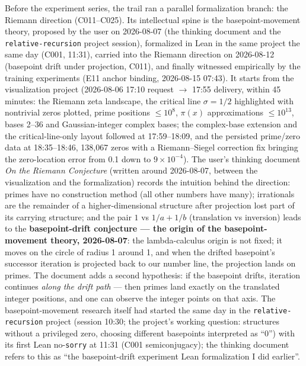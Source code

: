\documentclass[sigplan,10pt,anonymous,review]{acmart}
\begin{document}
Before the experiment series, the trail ran a parallel formalization branch:
the Riemann direction (C011--C025). Its intellectual spine is the
basepoint-movement theory, proposed by the user on 2026-08-07 (the thinking
document and the \texttt{relative-recursion} project session), formalized
in Lean in the same project the same day (C001, 11:31), carried into the
Riemann direction on 2026-08-12 (basepoint drift under projection,
C011), and finally witnessed empirically by the training experiments
(E11 anchor binding, 2026-08-15 07:43). It starts from the visualization project
(2026-08-06 17:10 request $\to$ 17:55 delivery, within 45 minutes: the
Riemann zeta landscape, the critical line $\sigma=1/2$ highlighted with
nontrivial zeros plotted, prime positions $\le 10^8$, $\pi(x)$ approximations
$\le 10^{13}$, bases 2--36 and Gaussian-integer complex bases; the complex-base
extension and the critical-line-only layout followed at 17:59--18:09, and the
persisted prime/zero data at 18:35--18:46, 138{,}067 zeros with a
Riemann--Siegel correction fix bringing the zero-location error from 0.1 down
to $9\times10^{-4}$). The user's thinking document \emph{On the Riemann
Conjecture} (written around 2026-08-07, between the visualization and the
formalization) records the intuition behind the direction: primes have no
construction method (all other numbers have many); irrationals are the
remainder of a higher-dimensional structure after projection lost part of its
carrying structure; and the pair $1$ vs $1/a+1/b$ (translation vs inversion)
leads to the \textbf{basepoint-drift conjecture --- the origin of the
basepoint-movement theory, 2026-08-07}: the lambda-calculus origin is not
fixed; it moves on the circle of radius 1 around 1, and when the drifted
basepoint's successor iteration is projected back to our number line, the
projection lands on primes. The document adds a second hypothesis: if the
basepoint drifts, iteration continues \emph{along the drift path} --- then
primes land exactly on the translated integer positions, and one can
observe the integer points on that axis. The basepoint-movement research
itself had started the same day in the \texttt{relative-recursion} project
(session 10:30; the project's working question: structures without a
privileged zero, choosing different basepoints interpreted as ``0'') with
its first Lean no-\texttt{sorry} at 11:31 (C001 semiconjugacy); the
thinking document refers to this as ``the basepoint-drift experiment Lean
formalization I did earlier''.
\end{document}
